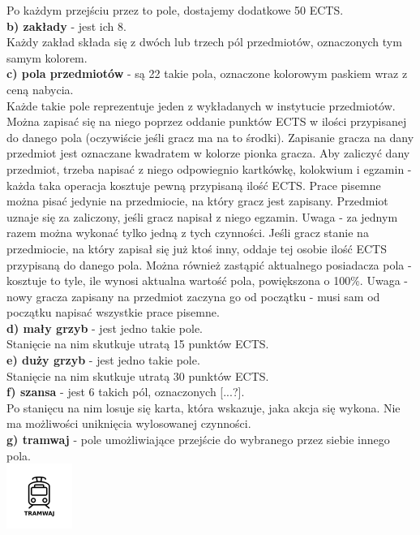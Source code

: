 \documentclass[a4paper]{article}
\begin{document}
\indent Po każdym przejściu przez to pole, dostajemy dodatkowe 50 ECTS.\\
\noindent \textbf{b) zakłady} - jest ich 8.\\
\indent Każdy zakład składa się z dwóch lub trzech pól przedmiotów, oznaczonych tym samym kolorem.\\
\noindent \textbf{c) pola przedmiotów} - są 22 takie pola, oznaczone kolorowym paskiem wraz z ceną nabycia.\\ \indent Każde takie pole reprezentuje jeden z wykładanych w instytucie przedmiotów. Można zapisać się na niego poprzez oddanie punktów ECTS w ilości przypisanej do danego pola (oczywiście jeśli gracz ma na to środki). Zapisanie gracza na dany przedmiot jest oznaczane kwadratem w kolorze pionka gracza. Aby zaliczyć dany przedmiot, trzeba napisać z niego odpowiegnio kartkówkę, kolokwium i egzamin - każda taka operacja kosztuje pewną przypisaną ilość ECTS. Prace pisemne można pisać jedynie na przedmiocie, na który gracz jest zapisany. Przedmiot uznaje się za zaliczony, jeśli gracz napisał z niego egzamin. Uwaga - za jednym razem można wykonać tylko jedną z tych czynności. Jeśli gracz stanie na przedmiocie, na który zapisał się już ktoś inny, oddaje tej osobie ilość ECTS przypisaną do danego pola. Można również zastąpić aktualnego posiadacza pola - kosztuje to tyle, ile wynosi aktualna wartość pola, powiększona o 100\%. Uwaga - nowy gracza zapisany na przedmiot zaczyna go od początku - musi sam od początku napisać wszystkie prace pisemne.\\ 
\noindent \textbf{d) mały grzyb} - jest jedno takie pole.\\
\indent Stanięcie na nim skutkuje utratą 15 punktów ECTS.\\
\noindent \textbf{e) duży grzyb} - jest jedno takie pole.\\
\indent Stanięcie na nim skutkuje utratą 30 punktów ECTS.\\
\noindent \textbf{f) szansa} - jest 6 takich pól, oznaczonych [...?]. \\
\indent Po stanięcu na nim losuje się karta, która wskazuje, jaka akcja się wykona. Nie ma możliwości uniknięcia wylosowanej czynności.\\
\noindent \textbf{g) tramwaj} - pole umożliwiające przejście do wybranego przez siebie innego pola.\\
\indent\includegraphics[scale=0.8]{tram.png}\\
\end{document}
